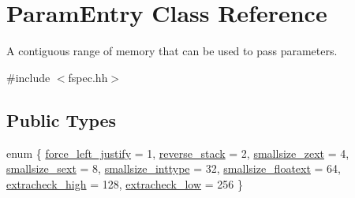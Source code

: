 \hypertarget{class_param_entry}{}\section{Param\+Entry Class Reference}
\label{class_param_entry}


A contiguous range of memory that can be used to pass parameters.  




{\ttfamily \#include $<$fspec.\+hh$>$}

\subsection*{Public Types}
\begin{DoxyCompactItemize}
\item 
enum \{ \newline
\mbox{\hyperlink{class_param_entry_ac2717c4cafbf14b70f326ae8bac627c3a6445d0ea4550d0f61d3fd399ce0b132c}{force\+\_\+left\+\_\+justify}} = 1, 
\mbox{\hyperlink{class_param_entry_ac2717c4cafbf14b70f326ae8bac627c3a45b2f9c4e8d3b35690dc840d2166fe51}{reverse\+\_\+stack}} = 2, 
\mbox{\hyperlink{class_param_entry_ac2717c4cafbf14b70f326ae8bac627c3a073a14d23a40a6d2755460a4bce6e2e9}{smallsize\+\_\+zext}} = 4, 
\mbox{\hyperlink{class_param_entry_ac2717c4cafbf14b70f326ae8bac627c3a21054b237603831d14b82b9d16b5baeb}{smallsize\+\_\+sext}} = 8, 
\newline
\mbox{\hyperlink{class_param_entry_ac2717c4cafbf14b70f326ae8bac627c3adf66695cb7eff34dbf4d2ef63d09174d}{smallsize\+\_\+inttype}} = 32, 
\mbox{\hyperlink{class_param_entry_ac2717c4cafbf14b70f326ae8bac627c3a5fcca54ba25ce326bb9c9a58264bed88}{smallsize\+\_\+floatext}} = 64, 
\mbox{\hyperlink{class_param_entry_ac2717c4cafbf14b70f326ae8bac627c3a99f501dbe12bd1271a10979776d61a47}{extracheck\+\_\+high}} = 128, 
\mbox{\hyperlink{class_param_entry_ac2717c4cafbf14b70f326ae8bac627c3a1faec835456469d104135ab2d0aa915e}{extracheck\+\_\+low}} = 256
 \}
\end{DoxyCompactItemize}
